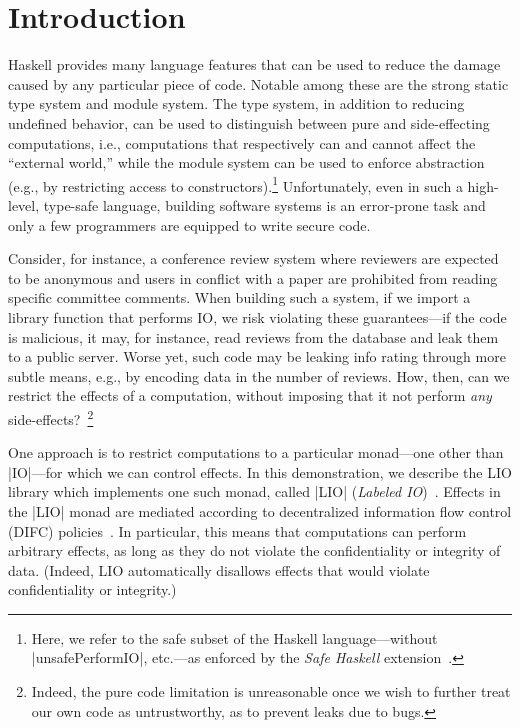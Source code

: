 \section{Introduction}
\label{sec:intro}

Haskell provides many language features that can be used to reduce the
damage caused by any particular piece of code.
%
Notable among these are the strong static type system and module
system.
%
The type system, in addition to reducing undefined behavior, can be
used to distinguish between pure and side-effecting computations,
i.e., computations that respectively can and cannot affect the
``external world,'' while the module system can be used to enforce
abstraction (e.g., by restricting access to constructors).\footnote{
  Here, we refer to the safe subset of the Haskell language---without
  \hs|unsafePerformIO|, etc.---as enforced by
  the \emph{Safe Haskell} extension~\cite{safehaskell}.
}
%
Unfortunately, even in such a high-level, type-safe language, building
software systems is an error-prone task and only a few programmers are
equipped to write secure code.
 
Consider, for instance, a conference review system where reviewers are
expected to be anonymous and users in conflict with a paper are
prohibited from reading specific committee comments.
%
When building such a system, if we import a library function that
performs IO, we risk violating these guarantees---if the code is
malicious, it may, for instance, read reviews from the database and
leak them to a public server.
%
Worse yet, such code may be leaking info rating through more subtle
means, e.g., by encoding data in the number of reviews.
%
How, then, can we restrict the effects of a computation, without
imposing that it not perform \emph{any} side-effects?~\footnote{
  Indeed, the pure code limitation is unreasonable once we wish to
  further treat our own code as untrustworthy, as to prevent leaks due
  to bugs.
}

One approach is to restrict computations to a particular monad---one
other than \hs|IO|---for which we can control effects.
%
In this demonstration, we describe the LIO library which implements
one such monad, called \hs|LIO| (\emph{Labeled IO})~\cite{lio,
concurrent-lio}.
%
Effects in the \hs|LIO| monad are mediated according to
decentralized information flow control (DIFC)
policies~\cite{myers:dlm, sabelfeld:language-based-iflow}.
%
In particular, this means that computations can perform arbitrary
effects, as long as they do not violate the confidentiality or
integrity of data.
%
(Indeed, LIO automatically disallows effects that would violate
confidentiality or integrity.)
